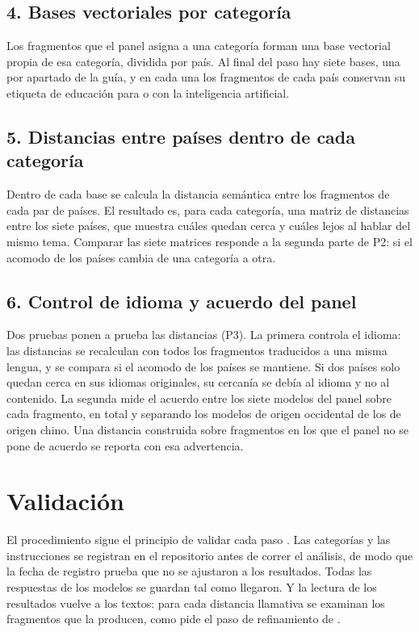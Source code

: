 \subsection*{4. Bases vectoriales por categoría}

Los fragmentos que el panel asigna a una categoría forman una base vectorial propia de esa
categoría, dividida por país. Al final del paso hay siete bases, una por apartado de la
guía, y en cada una los fragmentos de cada país conservan su etiqueta de educación para o
con la inteligencia artificial.

\subsection*{5. Distancias entre países dentro de cada categoría}

Dentro de cada base se calcula la distancia semántica entre los fragmentos de cada par de
países. El resultado es, para cada categoría, una matriz de distancias entre los siete
países, que muestra cuáles quedan cerca y cuáles lejos al hablar del mismo tema. Comparar
las siete matrices responde a la segunda parte de P2: si el acomodo de los países cambia
de una categoría a otra.

\subsection*{6. Control de idioma y acuerdo del panel}

Dos pruebas ponen a prueba las distancias (P3). La primera controla el idioma: las
distancias se recalculan con todos los fragmentos traducidos a una misma lengua, y se
compara si el acomodo de los países se mantiene. Si dos países solo quedan cerca en sus
idiomas originales, su cercanía se debía al idioma y no al contenido. La segunda mide el
acuerdo entre los siete modelos del panel sobre cada fragmento, en total y separando los
modelos de origen occidental de los de origen chino. Una distancia construida sobre
fragmentos en los que el panel no se pone de acuerdo se reporta con esa advertencia.

\section{Validación}
\label{sec:validacion}

El procedimiento sigue el principio de validar cada paso \citep{grimmer2013text}. Las
categorías y las instrucciones se registran en el repositorio antes de correr el análisis,
de modo que la fecha de registro prueba que no se ajustaron a los resultados. Todas las
respuestas de los modelos se guardan tal como llegaron. Y la lectura de los resultados
vuelve a los textos: para cada distancia llamativa se examinan los fragmentos que la
producen, como pide el paso de refinamiento de \citet{nelson2020computational}.

